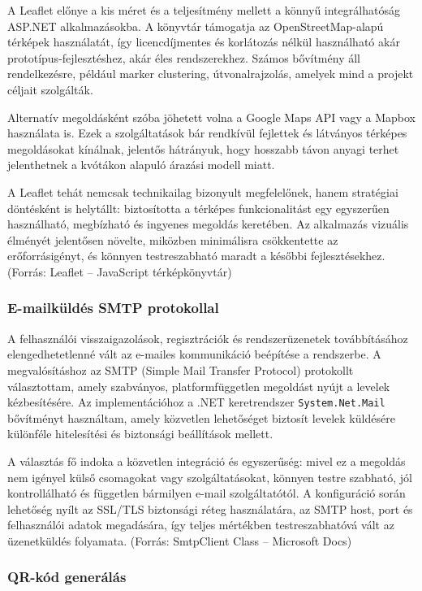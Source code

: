 A Leaflet előnye a kis méret és a teljesítmény mellett a könnyű integrálhatóság ASP.NET alkalmazásokba. A könyvtár támogatja az OpenStreetMap-alapú térképek használatát, így licencdíjmentes és korlátozás nélkül használható akár prototípus-fejlesztéshez, akár éles rendszerekhez. Számos bővítmény áll rendelkezésre, például marker clustering, útvonalrajzolás, amelyek mind a projekt céljait szolgálták.

Alternatív megoldásként szóba jöhetett volna a Google Maps API vagy a Mapbox használata is. Ezek a szolgáltatások bár rendkívül fejlettek és látványos térképes megoldásokat kínálnak, jelentős hátrányuk, hogy hosszabb távon anyagi terhet jelenthetnek a kvótákon alapuló árazási modell miatt. 

A Leaflet tehát nemcsak technikailag bizonyult megfelelőnek, hanem stratégiai döntésként is helytállt: biztosította a térképes funkcionalitást egy egyszerűen használható, megbízható és ingyenes megoldás keretében. Az alkalmazás vizuális élményét jelentősen növelte, miközben minimálisra csökkentette az erőforrásigényt, és könnyen testreszabható maradt a későbbi fejlesztésekhez.(Forrás: Leaflet – JavaScript térképkönyvtár)

\subsubsection{E-mailküldés SMTP protokollal}


\indent A felhasználói visszaigazolások, regisztrációk és rendszerüzenetek továbbításához elengedhetetlenné vált az e-mailes kommunikáció beépítése a rendszerbe. A megvalósításhoz az SMTP (Simple Mail Transfer Protocol) protokollt választottam, amely szabványos, platformfüggetlen megoldást nyújt a levelek kézbesítésére. Az implementációhoz a .NET keretrendszer \texttt{System.Net.Mail} bővítményt használtam, amely közvetlen lehetőséget biztosít levelek küldésére különféle hitelesítési és biztonsági beállítások mellett.

A választás fő indoka a közvetlen integráció és egyszerűség: mivel ez a megoldás nem igényel külső csomagokat vagy szolgáltatásokat, könnyen testre szabható, jól kontrollálható és független bármilyen e-mail szolgáltatótól. A konfiguráció során lehetőség nyílt az SSL/TLS biztonsági réteg használatára, az SMTP host, port és felhasználói adatok megadására, így teljes mértékben testreszabhatóvá vált az üzenetküldés folyamata. (Forrás: SmtpClient Class – Microsoft Docs)

\subsubsection{QR-kód generálás}

